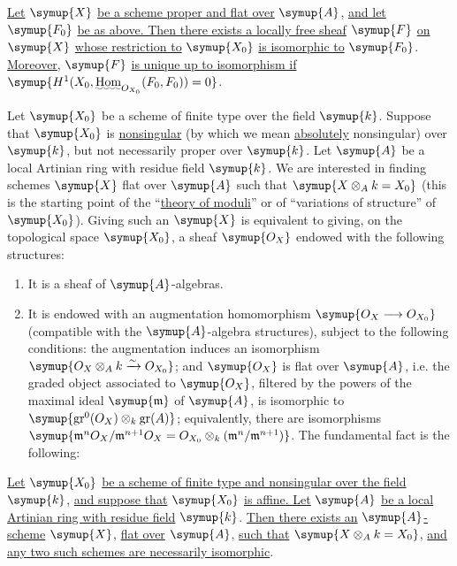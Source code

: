  \uline{Let} $\symup{X}$ \uline{be a scheme proper and flat over} $\symup{A}$, \uline{and let}
$\symup{F_0}$ \uline{be as above. Then there exists a locally free sheaf} $\symup{F}$ \uline{on} $\symup{X}$ \uline{whose
restriction to} $\symup{X_0}$ \uline{is isomorphic to} $\symup{F_0}$. \uline{Moreover}, $\symup{F}$ \uline{is unique up to
isomorphism if} $\symup{H^1(X_0,\mathop{\text{\uwave{Hom}}}\nolimits_{O_{X_0}}(F_0,F_0))=0}$.

Let $\symup{X_0}$ be a scheme of finite type over the field $\symup{k}$. Suppose that $\symup{X_0}$ is
\uline{nonsingular} (by which we mean \uline{absolutely} nonsingular) over $\symup{k}$, but not
necessarily proper over $\symup{k}$. Let $\symup{A}$ be a local Artinian ring with residue
field $\symup{k}$. We are interested in finding schemes $\symup{X}$ flat over $\symup{A}$ such that
$\symup{X\otimes_A k=X_0}$ (this is the starting point of the “\uline{theory of moduli}” or
of “variations of 
structure” of $\symup{X_0}$). Giving such an $\symup{X}$ is equivalent to
giving, on the topological space $\symup{X_0}$, a sheaf $\symup{O_X}$ endowed with the
following structures:
\begin{enumerate}
  \item[\textnormal{i.}] It is a sheaf of $\symup{A}$-algebras.
  \item[\textnormal{ii.}] It is endowed with an augmentation homomorphism
    $\symup{O_X\longrightarrow O_{X_0}}$ (compatible with the $\symup{A}$-algebra
    structures), subject to the following conditions: the augmentation
    induces an isomorphism
    $\symup{O_X\otimes_A k\xrightarrow{\sim}O_{X_0}}$; and $\symup{O_X}$ is flat
    over $\symup{A}$, i.e. the graded object associated to $\symup{O_X}$, filtered by the
    powers of the maximal ideal $\symup{\mathfrak m}$ of $\symup{A}$, is isomorphic to
    $\symup{\operatorname{gr}^0(O_X)\otimes_k\operatorname{gr}(A)}$; equivalently,
    there are isomorphisms
    $\symup{\mathfrak m^nO_X/\mathfrak m^{n+1}O_X =O_{X_0}\otimes_k(\mathfrak m^n/\mathfrak m^{n+1})}$.
The fundamental fact is the following:
\end{enumerate}


 \uline{Let} $\symup{X_0}$ \uline{be a scheme of finite type and nonsingular over
the field} $\symup{k}$, \uline{and suppose that} $\symup{X_0}$ \uline{is affine. Let} $\symup{A}$ \uline{be a local Artinian
ring with residue field} $\symup{k}$. \uline{Then there exists an} $\symup{A}$\uline{-scheme} $\symup{X}$, \uline{flat over}
$\symup{A}$, \uline{such that} $\symup{X\otimes_A k=X_0}$, \uline{and any two such schemes are necessarily
isomorphic}.

